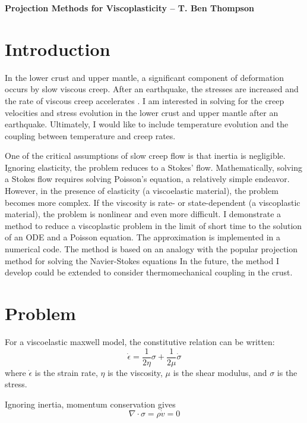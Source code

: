 \documentclass[a4paper]{article}
\begin{document}
\textbf{Projection Methods for Viscoplasticity -- T. Ben Thompson}
\tableofcontents

\section{Introduction}
In the lower crust and upper mantle, a significant component of deformation occurs by slow viscous creep. 
After an earthquake, the stresses are increased and the rate of viscous creep accelerates \citep{Burgmann2008}.
I am interested in solving for the creep velocities and stress evolution in the lower crust and upper mantle after an earthquake.
Ultimately, I would like to include temperature evolution and the coupling between temperature and creep rates. 

One of the critical assumptions of slow creep flow is that inertia is negligible. Ignoring elasticity, the problem reduces
to a Stokes' flow. Mathematically, solving a Stokes flow requires solving Poisson's equation, a relatively simple endeavor. 
However, in the presence of elasticity (a viscoelastic material), the problem becomes more complex. 
If the viscosity is rate- or state-dependent (a viscoplastic material), the problem is nonlinear and even more difficult.
I demonstrate a method to reduce a viscoplastic problem in the limit of short time to the solution of an ODE and a Poisson equation.
The approximation is implemented in a numerical code.
The method is based on an analogy with the popular projection method for solving the Navier-Stokes equations \citep{Guermond2006}
In the future, the method I develop could be extended to consider thermomechanical coupling in the crust.

\section{Problem}
For a viscoelastic maxwell model, the constitutive relation can be written:
\begin{equation}
    \dot\epsilon = \frac{1}{2\eta}\sigma + \frac{1}{2\mu}\dot\sigma
    \label{const}
\end{equation}
where $\dot\epsilon$ is the strain rate, $\eta$ is the viscosity, $\mu$ is the shear modulus, and $\sigma$ is the stress. 

Ignoring inertia, momentum conservation gives
\begin{equation}
    \nabla \cdot \sigma = \rho \dot v = 0
    \label{mom}
\end{equation}
\end{document}
